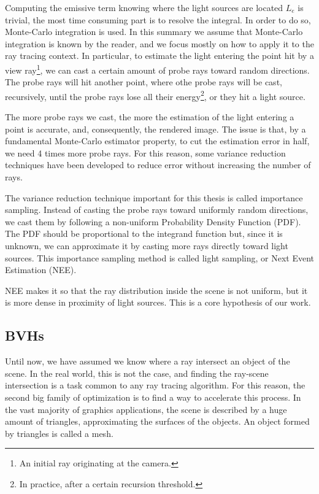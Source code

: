 \documentclass[11pt,a4paper,twocolumn]{article}
\begin{document}
Computing the emissive term knowing where the light sources are located $L_e$ is trivial, the most time consuming part is to resolve the integral. In order to do so, Monte-Carlo integration is used. In this summary we assume that Monte-Carlo integration is known by the reader, and we focus mostly on how to apply it to the ray tracing context. In particular, to estimate the light entering the point hit by a view ray\footnote{An initial ray originating at the camera.}, we can cast a certain amount of probe rays toward random directions. The probe rays will hit another point, where othe probe rays will be cast, recursively, until the probe rays lose all their energy\footnote{In practice, after a certain recursion threshold.}, or they hit a light source.

The more probe rays we cast, the more the estimation of the light entering a point is accurate, and, consequently, the rendered image. The issue is that, by a fundamental Monte-Carlo estimator property, to cut the estimation error in half, we need 4 times more probe rays. For this reason, some variance reduction techniques have been developed to reduce error without increasing the number of rays.

The variance reduction technique important for this thesis is called importance sampling. Instead of casting the probe rays toward uniformly random directions, we cast them by following a non-uniform Probability Density Function (PDF). The PDF should be proportional to the integrand function but, since it is unknown, we can approximate it by casting more rays directly toward light sources. This importance sampling method is called light sampling, or Next Event Estimation (NEE).

NEE makes it so that the ray distribution inside the scene is not uniform, but it is more dense in proximity of light sources. This is a core hypothesis of our work.

\subsection{BVHs}
Until now, we have assumed we know where a ray intersect an object of the scene. In the real world, this is not the case, and finding the ray-scene intersection is a task common to any ray tracing algorithm. For this reason, the second big family of optimization is to find a way to accelerate this process. In the vast majority of graphics applications, the scene is described by a huge amount of triangles, approximating the surfaces of the objects. An object formed by triangles is called a mesh.
\end{document}
